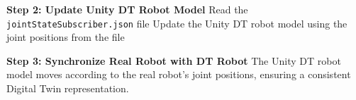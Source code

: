 \begin{itemize}
\begin{algorithm}
\begin{algorithmic}[1]
            \State \textbf{Step 2: Update Unity \ac{DT} Robot Model}
                \State Read the \texttt{jointStateSubscriber.json} file
                \State Update the Unity \ac{DT} robot model using the joint positions from the file
            \EndWhile
    
            \State \textbf{Step 3: Synchronize Real Robot with \ac{DT} Robot}
            \State The Unity \ac{DT} robot model moves according to the real robot’s joint positions, ensuring a consistent Digital Twin representation.
        \end{algorithmic}
    \end{algorithm}
    
\end{itemize}

    
    
    
 
    
